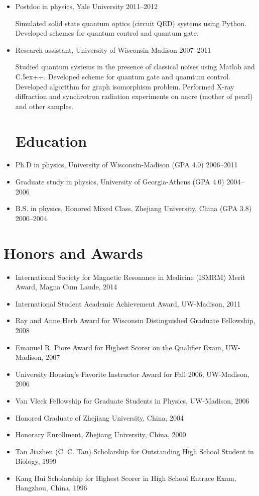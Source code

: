 \documentclass[centered,11pt,overlapped]{res}
\def\Cplusplus{{\rm C\raise.5ex\hbox{\small ++}}}
\begin{document}
\begin{resume}
{\begin{itemize}
Solved ill-posed inverse problems in medical imaging using Matlab, C and \Cplusplus.
Developed probes for transcranial magnetic stimulation.
\item Postdoc in physics, Yale University \hfill 2011--2012

Simulated solid state quantum optics (circuit QED) systems using Python. 
Developed schemes for quantum control and quantum gate.
\item {Research assistant, University of Wisconsin-Madison} \hfill {2007--2011} 

Studied quantum systems in the presence of classical noises using Matlab and \Cplusplus.
Developed scheme for quantum gate and quamtum control. 
Developed algorithm for graph isomorphism problem.
Performed X-ray diffraction and synchrotron radiation experiments on nacre (mother of pearl) and other samples.

\section{\sc Education}
\item {Ph.D in physics, University of Wisconsin-Madison (GPA 4.0)} \hfill {2006--2011} 
\item {Graduate study in physics, University of Georgia-Athens (GPA 4.0)} \hfill {2004--2006}  
\item {B.S. in physics, Honored Mixed Class},  
{Zhejiang University, China (GPA 3.8)} \hfill {2000--2004}  
\end{itemize}



\section{\sc Honors and Awards}
\begin{itemize}[leftmargin=-0.1in]
\item International Society for Magnetic Resonance in Medicine (ISMRM) Merit Award, Magna Cum Laude, 2014
\item International Student Academic Achievement Award, UW-Madison, 2011
\item Ray and Anne Herb Award for Wisconsin Distinguished Graduate Fellowship, 2008
\item Emanuel R. Piore Award for Highest Scorer on the Qualifier Exam, UW-Madison, 2007
\item University Housing's Favorite Instructor Award for Fall 2006, UW-Madison, 2006
\item Van Vleck Fellowship for Graduate Students in Physics, UW-Madison, 2006
\item Honored Graduate of Zhejiang University, China, 2004
\item Honorary Enrollment, Zhejiang University, China, 2000
\item Tan Jiazhen (C. C. Tan) Scholarship for Outstanding High School Student in Biology, 1999
\item Kang Hui Scholarship for Highest Scorer in High School Entrace Exam, Hangzhou, China, 1996
\end{itemize}


}
\end{resume}
\end{document}
